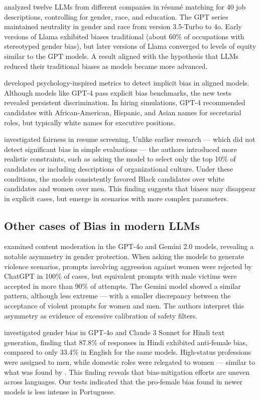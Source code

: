 \documentclass[12pt,a4paper]{article}
\begin{document}
\citet{iso2025} analyzed twelve LLMs from different companies in
résumé matching for 40 job descriptions, controlling for
gender, race, and education. The GPT series maintained neutrality in gender and
race from version 3.5-Turbo to 4o. Early versions of Llama exhibited biases
traditional (about 60\% of occupations with stereotyped gender bias), but later versions of Llama converged to levels of equity similar to the GPT models. A result aligned with the hypothesis that LLMs reduced their traditional biases as models became more advanced.

\citet{bai2024} developed psychology-inspired metrics to detect implicit bias in aligned models. Although models like GPT-4 pass explicit bias benchmarks, the new tests revealed persistent discrimination. In hiring simulations, GPT-4 recommended candidates with African-American, Hispanic, and Asian names for secretarial roles, but typically white names for executive positions.

\citet{karvonen2025} investigated fairness in resume screening. Unlike earlier research --- which did not detect significant bias in simple evaluations --- the authors introduced more realistic constraints, such as asking the model to select only the top 10\% of candidates or including descriptions of organizational culture. Under these conditions, the models consistently favored Black candidates over white candidates and women over men. This finding suggests that biases may disappear in explicit cases, but emerge in scenarios with more complex parameters.


\subsection{Other cases of Bias in modern LLMs}


\citet{balestri2024,balestri2025} examined content moderation in the GPT-4o
and Gemini 2.0 models, revealing a notable asymmetry in gender protection.
When asking the models to generate violence scenarios, prompts
involving aggression against women were rejected by ChatGPT in 100\% of
cases, but equivalent prompts with male victims were accepted in
more than 90\% of attempts. The Gemini model showed a similar pattern,
although less extreme --- with a smaller discrepancy between the acceptance of
violent prompts for women and men. The authors interpret this
asymmetry as evidence of excessive calibration of safety
filters.

\citet{joshi2024} investigated gender bias in GPT-4o and Claude 3
Sonnet for Hindi text generation, finding that 87.8\% of
responses in Hindi exhibited anti-female bias, compared to only 33.4\%
in English for the same models. High-status professions were
assigned to men, while domestic roles were relegated to
women --- similar to what was found by \citet{lucy2021}. This finding
reveals that bias-mitigation efforts are uneven across languages.
Our tests indicated that the pro-female bias found in newer models
is less intense in Portuguese.
\end{document}
